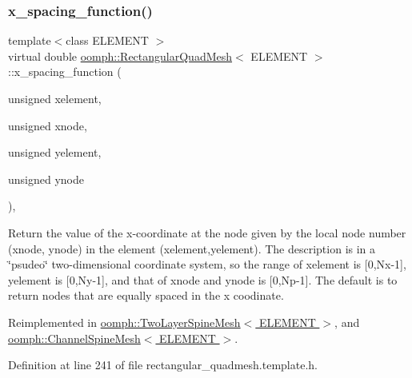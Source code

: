\mbox{\label{classoomph_1_1RectangularQuadMesh_ad4c2f349cf201cb3107f0a4e5447c16f}} 
\subsubsection{\texorpdfstring{x\+\_\+spacing\+\_\+function()}{x\_spacing\_function()}}
{\footnotesize\ttfamily template$<$class E\+L\+E\+M\+E\+NT $>$ \\
virtual double \hyperlink{classoomph_1_1RectangularQuadMesh}{oomph\+::\+Rectangular\+Quad\+Mesh}$<$ E\+L\+E\+M\+E\+NT $>$\+::x\+\_\+spacing\+\_\+function (\begin{DoxyParamCaption}\item[{unsigned}]{xelement,  }\item[{unsigned}]{xnode,  }\item[{unsigned}]{yelement,  }\item[{unsigned}]{ynode }\end{DoxyParamCaption})\hspace{0.3cm}{\ttfamily [inline]}, {\ttfamily [virtual]}}



Return the value of the x-\/coordinate at the node given by the local node number (xnode, ynode) in the element (xelement,yelement). The description is in a \char`\"{}psudeo\char`\"{} two-\/dimensional coordinate system, so the range of xelement is \mbox{[}0,Nx-\/1\mbox{]}, yelement is \mbox{[}0,Ny-\/1\mbox{]}, and that of xnode and ynode is \mbox{[}0,Np-\/1\mbox{]}. The default is to return nodes that are equally spaced in the x coodinate. 



Reimplemented in \hyperlink{classoomph_1_1TwoLayerSpineMesh_a5fd9eae27ba19788e0b397936f0c5ead}{oomph\+::\+Two\+Layer\+Spine\+Mesh$<$ E\+L\+E\+M\+E\+N\+T $>$}, and \hyperlink{classoomph_1_1ChannelSpineMesh_a16e0d4264443b1beb274753b0d6b970e}{oomph\+::\+Channel\+Spine\+Mesh$<$ E\+L\+E\+M\+E\+N\+T $>$}.



Definition at line 241 of file rectangular\+\_\+quadmesh.\+template.\+h.



